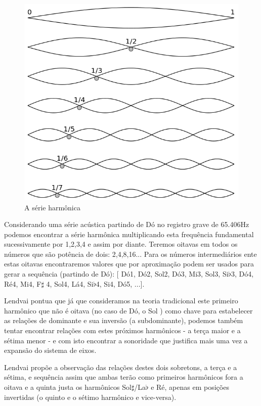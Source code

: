 \documentclass[
	12pt,				%
	openright,			%
	twoside,			%
	a4paper,			%
	english,			%
	french,				%
	spanish,			%
	brazil				%
	]{abntex2}
\begin{document}
\begin{figure}[!h]
	\caption{\label{fig_grafico}A série harmônica }
	\begin{center}
	    \includegraphics[scale=0.3]{axis/serie_harmonica.png}
	\end{center}
\end{figure}

Considerando uma série acústica partindo de Dó no registro grave de 65.406Hz podemos encontrar a série harmônica multiplicando esta frequência fundamental sucessivamente por 1,2,3,4 e assim por diante. Teremos oitavas em todos os números que são potência de dois: 2,4,8,16... Para os números intermediários ente estas oitavas encontraremos valores que por aproximação podem ser usados para gerar a sequência (partindo de Dó): [ Dó1, Dó2, Sol2, Dó3, Mi3, Sol3, Si$\flat$3, Dó4, Ré4, Mi4, F$\sharp$ 4, Sol4, Lá4, Si$\flat$4, Si4, Dó5, ...].

Lendvai pontua que já que consideramos na teoria tradicional este primeiro harmônico que não é oitava (no caso de Dó, o Sol ) como chave para estabelecer as relações de dominante e sua inversão (a subdominante), podemos também tentar encontrar relações com estes próximos harmônicos - a terça maior e a sétima menor - e com isto encontrar a sonoridade que justifica mais uma vez a expansão do sistema de eixos.

Lendvai propõe a observação das relações destes dois sobretons, a terça e a sétima, e sequência assim que ambas terão como primeiros harmônicos fora a oitava e a quinta justa os harmônicos Sol$\sharp$/La$\flat$  e Ré, apenas em posições invertidas (o quinto e o sétimo harmônico e vice-versa).
\end{document}
